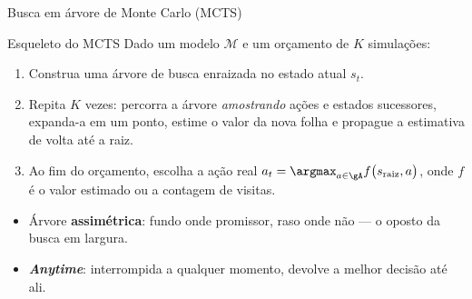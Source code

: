 \documentclass[aspectratio=169, 11pt]{beamer}
\newcommand{\Mmod}{\mathcal{M}}                 %
\newcommand{\raiz}{s_{\mathrm{raiz}}}
\begin{document}
\begin{frame}{Busca em árvore de Monte Carlo (MCTS)}
  \begin{algbox}{Esqueleto do MCTS}
    Dado um modelo $\Mmod$ e um orçamento de $K$ simulações:
    \begin{enumerate}\setlength{\itemsep}{0.25ex}
      \item Construa uma árvore de busca enraizada no estado atual $s_t$.
      \item Repita $K$ vezes: percorra a árvore \emph{amostrando} ações e
            estados sucessores, expanda-a em um ponto, estime o valor da nova
            folha e propague a estimativa de volta até a raiz.
      \item Ao fim do orçamento, escolha a ação real
            $a_t = \argmax_{a\in\gA} f\bigl(\raiz, a\bigr)$, onde $f$ é o valor
            estimado ou a contagem de visitas.
    \end{enumerate}
  \end{algbox}

  \pause
  \begin{itemize}
    \item Árvore \textbf{assimétrica}: fundo onde promissor, raso onde não — o oposto da busca em largura.
    \item \textbf{\emph{Anytime}}: interrompida a qualquer momento, devolve a melhor decisão até ali.
  \end{itemize}
\end{frame}
\end{document}
